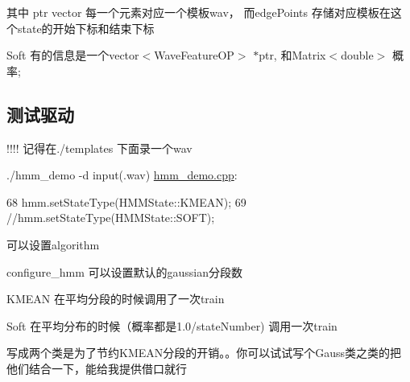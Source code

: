 其中 ptr vector 每一个元素对应一个模板wav， 而edge\+Points 存储对应模板在这个state的开始下标和结束下标

Soft 有的信息是一个vector$<$\+Wave\+Feature\+O\+P$>$ $\ast$ptr, 和\+Matrix$<$double$>$ 概率;

\subsection*{测试驱动}

!!!! 记得在./templates 下面录一个wav
\begin{DoxyItemize}
\item ./hmm\+\_\+demo -\/d input(.wav) \hyperlink{hmm__demo_8cpp}{hmm\+\_\+demo.\+cpp}\+: \begin{DoxyVerb}68 hmm.setStateType(HMMState::KMEAN);
69 //hmm.setStateType(HMMState::SOFT);
\end{DoxyVerb}

\end{DoxyItemize}

可以设置algorithm


\begin{DoxyItemize}
\item configure\+\_\+hmm 可以设置默认的gaussian分段数
\item K\+M\+E\+A\+N 在平均分段的时候调用了一次train
\item Soft 在平均分布的时候（概率都是1.0/state\+Number) 调用一次train

写成两个类是为了节约\+K\+M\+E\+A\+N分段的开销。。你可以试试写个\+Gauss类之类的把他们结合一下，能给我提供借口就行 
\end{DoxyItemize}